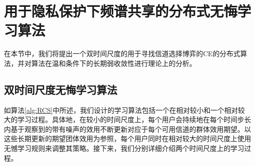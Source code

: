 \section{用于隐私保护下频谱共享的分布式无悔学习算法}\label{sec:algorithm}
在本节中，我们将提出一个双时间尺度的用于寻找信道选择博弈的CE的分布式算法，并对算法在温和条件下的长期弱收敛性进行理论上的分析。

\vspace{-0.2cm}

\subsection{双时间尺度无悔学习算法}

如算法\ref{alg:RCS}中所述，我们设计的学习算法包括一个在相对较小和一个相对较大的学习过程。具体地，在较小的时间尺度上，每个用户会持续地在每个时间步长内基于观察到的带有噪声的效用不断更新对应于每个可用信道的群体效用期望。以这些长期更新的期望团体效用为参照，每个用户同时在相对较大的时间尺度上使用无憾学习规则来调整其策略。接下来，我们分别详细介绍两个时间尺度上的学习过程。

